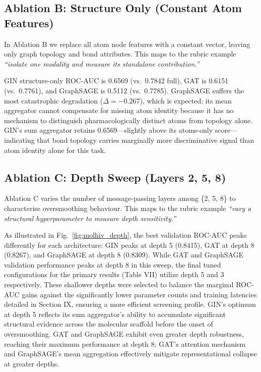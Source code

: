 \documentclass[conference]{IEEEtran}
\begin{document}
\subsection{Ablation B: Structure Only (Constant Atom Features)}

In Ablation B we replace all atom node features with a constant vector, leaving only graph topology and bond attributes. This maps to the rubric example \emph{``isolate one modality and measure its standalone contribution.''}

GIN structure-only ROC-AUC is 0.6569 (vs.\ 0.7842 full), GAT is 0.6151 (vs.\ 0.7761), and GraphSAGE is 0.5112 (vs.\ 0.7785). GraphSAGE suffers the most catastrophic degradation ($\Delta = -0.267$), which is expected: its mean aggregator cannot compensate for missing atom identity because it has no mechanism to distinguish pharmacologically distinct atoms from topology alone. GIN's sum aggregator retains 0.6569---slightly above its atoms-only score---indicating that bond topology carries marginally more discriminative signal than atom identity alone for this task.

\subsection{Ablation C: Depth Sweep (Layers 2, 5, 8)}

Ablation C varies the number of message-passing layers among \{2, 5, 8\} to characterise oversmoothing behaviour. This maps to the rubric example \emph{``vary a structural hyperparameter to measure depth sensitivity.''}

As illustrated in Fig.~\ref{fig:molhiv_depth}, the best validation ROC-AUC peaks differently for each architecture: GIN peaks at depth 5 (0.8415), GAT at depth 8 (0.8267), and GraphSAGE at depth 8 (0.8309). While GAT and GraphSAGE validation performance peaks at depth 8 in this sweep, the final tuned configurations for the primary results (Table VII) utilize depth 5 and 3 respectively. These shallower depths were selected to balance the marginal ROC-AUC gains against the significantly lower parameter counts and training latencies detailed in Section IX, ensuring a more efficient screening profile. GIN's optimum at depth 5 reflects its sum aggregator's ability to accumulate significant structural evidence across the molecular scaffold before the onset of oversmoothing. GAT and GraphSAGE exhibit even greater depth robustness, reaching their maximum performance at depth 8; GAT's attention mechanism and GraphSAGE's mean aggregation effectively mitigate representational collapse at greater depths.
\end{document}
